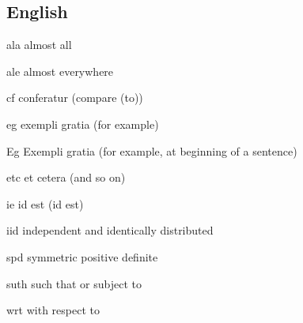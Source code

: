 \documentclass[english,a4paper,DIV=12,parskip=full,oneside]{scrartcl}
\begin{document}
        \subsection{English}
        \begin{commandlist}
            \item[ala] almost all \codeExample{\ala}
            \item[ale] almost everywhere \codeExample{\ale}
            \item[cf] conferatur (compare (to)) \codeExample{\cf}
            \item[eg] exempli gratia (for example) \codeExample{\eg}
            \item[Eg] Exempli gratia (for example, at beginning of a sentence) \codeExample{\Eg}
            \item[etc] et cetera (and so on) \codeExample{\etc}
            \item[ie] id est (id est) \codeExample{\ie}
            \item[iid] independent and identically distributed \codeExample{\iid}
            \item[spd] symmetric positive definite \codeExample{\spd}
            \item[suth] such that or subject to \codeExample{\suth}
            \item[wrt] with respect to \codeExample{\wrt}
        \end{commandlist}
\end{document}
